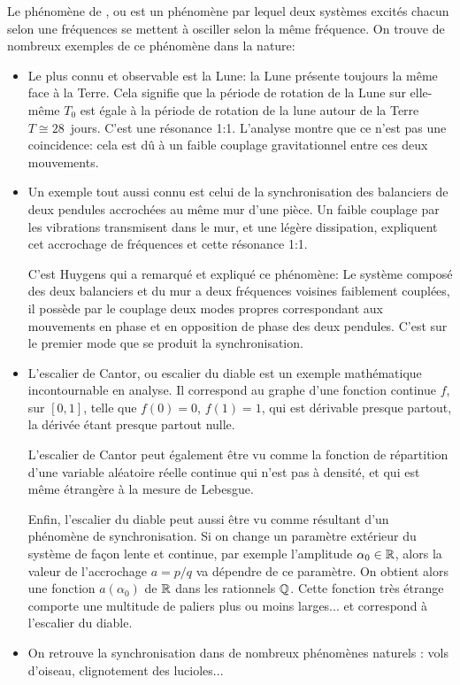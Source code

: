 \medskip
Le phénomène de , ou 
 est un phénomène par lequel deux systèmes excités 
chacun selon une fréquences se mettent à osciller selon la même fréquence. On trouve de nombreux 
exemples de ce phénomène dans la nature:
\begin{itemize}
   \item Le plus connu et observable est la Lune: la Lune présente toujours la même face à la Terre. 
	Cela signifie que la période de rotation de la Lune sur elle-même $T_0$ est égale à la 
	période de rotation de la lune autour de la Terre $T\cong 28$~jours. C'est une
	résonance 1:1. L'analyse montre que ce n'est pas une coincidence: cela
	est dû à un faible couplage gravitationnel entre ces deux mouvements.

   \item Un exemple tout aussi connu est celui de la synchronisation des balanciers de deux pendules accrochées 
	au même mur d'une pièce. Un faible couplage par les vibrations transmisent dans le mur, 
	et une légère dissipation, expliquent cet accrochage de fréquences et cette résonance 1:1.

	C'est Huygens qui a 
	remarqué et expliqué ce phénomène:
	Le système composé des deux balanciers et du mur a deux fréquences voisines faiblement 
	couplées, il possède par le couplage deux modes propres correspondant aux mouvements en 
	phase et en opposition de phase des deux pendules. C'est sur le premier mode 
	que se produit la synchronisation. 

   \item L'escalier de Cantor, 
	ou escalier du diable est un exemple mathématique incontournable en analyse.
	Il correspond au graphe d'une fonction continue $f$, sur $[0,1]$, telle que $f(0)=0$, $f(1)=1$, 
	qui est dérivable presque partout, la dérivée étant presque partout nulle.

	L'escalier de Cantor peut également être vu comme la fonction de répartition d'une variable 
	aléatoire réelle continue qui n'est pas à densité, et qui est même étrangère à la 
	mesure de Lebesgue. 

	Enfin, l'escalier du diable peut aussi être vu comme résultant d'un phénomène de 
	synchronisation.
	Si on change un paramètre extérieur du système de façon lente et continue, par
	exemple l'amplitude $\alpha_0\in\mathbb R$, alors la valeur de l'accrochage $a=p/q$ va dépendre de
	ce paramètre. On obtient alors une fonction $a(\alpha_0)$ de $\mathbb R$ dans les rationnels $\mathbb Q$. 
	Cette fonction très étrange comporte une multitude de paliers plus ou moins larges... et correspond
	à l'escalier du diable.
	
   \item On retrouve la synchronisation dans de nombreux phénomènes naturels : vols d'oiseau, 
	clignotement des lucioles...
\end{itemize}
